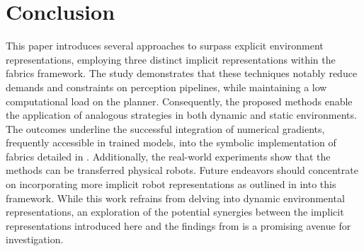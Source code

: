 \section{Conclusion}
\label{sec:ral24_conclusion}

This paper introduces several approaches to surpass explicit environment
representations, employing three distinct implicit representations within the
\ac{fabrics} framework. The study demonstrates that these techniques notably
reduce demands and constraints on perception pipelines, while maintaining a low
computational load on the planner. Consequently, the proposed methods enable the
application of analogous strategies in both dynamic and static environments. The
outcomes underline the successful integration of numerical gradients, frequently
accessible in trained models, into the symbolic implementation of \ac{fabrics}
detailed in \cite{Spahn2023}. Additionally, the real-world experiments show that
the methods can be transferred physical robots.
Future endeavors should concentrate on
incorporating more implicit robot representations as outlined in
\cite{Liu2022regularized,Koptev2023neural} into this framework. While this work
refrains from delving into dynamic environmental representations, an exploration
of the potential synergies between the implicit representations introduced here
and the findings from \cite{Spahn2023} is a promising avenue for investigation.
